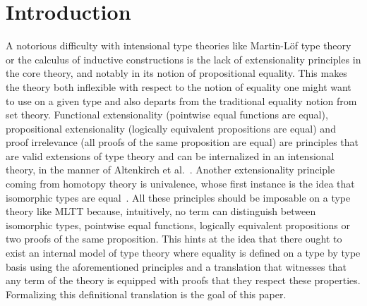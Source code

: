 \section{Introduction}
\label{sec:introduction}
A notorious difficulty with intensional type theories like Martin-Löf
type theory or the calculus of inductive constructions is the
lack of extensionality principles in the core theory, and notably in
its notion of propositional equality. This makes the theory both
inflexible with respect to the notion of equality one might want to
use on a given type and also departs from the traditional equality
notion from set theory. Functional extensionality (pointwise equal
functions are equal), propositional extensionality (logically
equivalent propositions are equal) and proof irrelevance (all proofs
of the same proposition are equal) are principles that are valid
extensions of type theory and can be internalized in an intensional
theory, in the manner of Altenkirch et al.~\cite{altenkirch-mcbride-wierstra:ott-now}.  Another
extensionality principle coming from homotopy theory is univalence,
whose first instance is the idea that isomorphic types are
equal~\cite{Voevodsky:2011yq,Pelayo:2012uq}. All these principles
should be imposable on a type theory like MLTT because, intuitively,
no term can distinguish between isomorphic types, pointwise equal
functions, logically equivalent propositions or two proofs of the same
proposition. This hints at the idea that there ought to exist an
internal model of type theory where equality is defined on a type by
type basis using the aforementioned principles and a translation that
witnesses that any term of the theory is equipped with proofs that
they respect these properties. Formalizing this definitional
translation is the goal of this paper.


